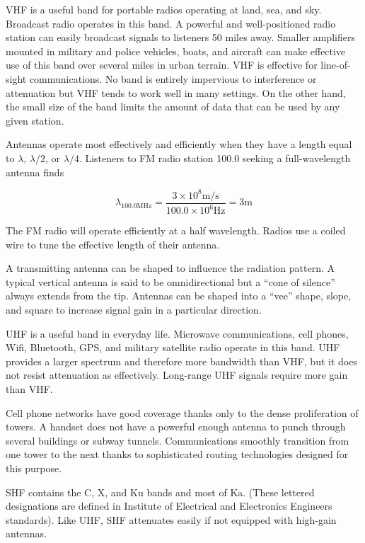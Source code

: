 \documentclass{book}
\begin{document}
VHF is a useful band for portable radios operating at land, sea, and sky. Broadcast radio operates in this band. A powerful and well-positioned radio station can easily broadcast signals to listeners 50 miles away. Smaller amplifiers mounted in military and police vehicles, boats, and aircraft can make effective use of this band over several miles in urban terrain. VHF is effective for line-of-sight communications. No band is entirely impervious to interference or attenuation but VHF tends to work well in many settings. On the other hand, the small size of the band limits the amount of data that can be used by any given station.

Antennas operate most effectively and efficiently when they have a length equal to $\lambda$, $\lambda/2$, or $\lambda/4$. Listeners to FM radio station 100.0 seeking a full-wavelength antenna finds

\begin{equation}
\lambda_{100.0 \si{\MHz}} = \frac{3 \times 10^8 \si{\meter}/\si{\second}}{100.0 \times 10^6 \si{\hertz}} = 3 \si{\meter}
\end{equation}

The FM radio will operate efficiently at a half wavelength. Radios use a coiled wire to tune the effective length of their antenna.

A transmitting antenna can be shaped to influence the radiation pattern. A typical vertical antenna is said to be omnidirectional but a ``cone of silence'' always extends from the tip. Antennas can be shaped into a ``vee'' shape, slope, and square to increase signal gain in a particular direction.

UHF is a useful band in everyday life. Microwave communications, cell phones, Wifi, Bluetooth, GPS, and military satellite radio operate in this band. UHF provides a larger spectrum and therefore more bandwidth than VHF, but it does not resist attenuation as effectively. Long-range UHF signals require more gain than VHF.

Cell phone networks have good coverage thanks only to the dense proliferation of towers. A handset does not have a powerful enough antenna to punch through several buildings or subway tunnels. Communications smoothly transition from one tower to the next thanks to sophisticated routing technologies designed for this purpose.

SHF contains the C, X, and Ku bands and most of Ka. (These lettered designations are defined in Institute of Electrical and Electronics Engineers standards). Like UHF, SHF attenuates easily if not equipped with high-gain antennas. 
\end{document}
